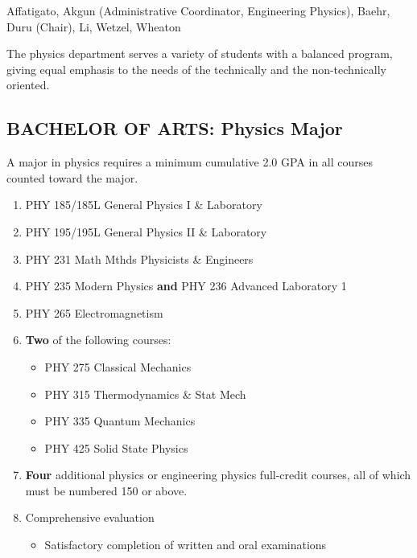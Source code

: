 \documentclass[
  letterpaper,
]{scrbook}
\providecommand{\tightlist}{%
  \setlength{\itemsep}{0pt}\setlength{\parskip}{0pt}}
\begin{document}
Affatigato, Akgun (Administrative Coordinator, Engineering Physics),
Baehr, Duru (Chair), Li, Wetzel, Wheaton

The physics department serves a variety of students with a balanced
program, giving equal emphasis to the needs of the technically and the
non-technically oriented.

\subsection{BACHELOR OF ARTS: Physics
Major}\label{bachelor-of-arts-physics-major}

A major in physics requires a minimum cumulative 2.0 GPA in all courses
counted toward the major.

\begin{enumerate}
\def\labelenumi{\arabic{enumi}.}
\tightlist
\item
  PHY 185/185L General Physics I \& Laboratory\\
\item
  PHY 195/195L General Physics II \& Laboratory\\
\item
  PHY 231 Math Mthds Physicists \& Engineers\\
\item
  PHY 235 Modern Physics \textbf{and} PHY 236 Advanced Laboratory 1\\
\item
  PHY 265 Electromagnetism\\
\item
  \textbf{Two} of the following courses:

  \begin{itemize}
  \tightlist
  \item
    PHY 275 Classical Mechanics\\
  \item
    PHY 315 Thermodynamics \& Stat Mech\\
  \item
    PHY 335 Quantum Mechanics\\
  \item
    PHY 425 Solid State Physics\\
  \end{itemize}
\item
  \textbf{Four} additional physics or engineering physics full-credit
  courses, all of which must be numbered 150 or above.\\
\item
  Comprehensive evaluation

  \begin{itemize}
  \tightlist
  \item
    Satisfactory completion of written and oral examinations
  \end{itemize}
\end{enumerate}
\end{document}
